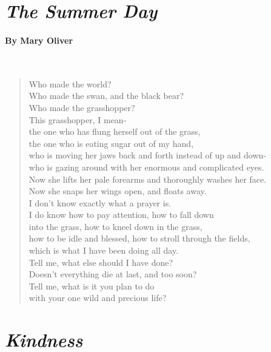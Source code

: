\newpage
{}
\section*{\emph{The Summer Day}}
\paragraph{By Mary Oliver}~
\begin{verse}
	Who made the world?\\
	Who made the swan, and the black bear?\\
	Who made the grasshopper?\\
	This grasshopper, I mean-\\
	the one who has flung herself out of the grass,\\
	the one who is eating sugar out of my hand,\\
	who is moving her jaws back and forth instead of up and down-\\
	who is gazing around with her enormous and complicated eyes.\\
	Now she lifts her pale forearms and thoroughly washes her face.\\
	Now she snaps her wings open, and floats away.\\
	I don't know exactly what a prayer is.\\
	I do know how to pay attention, how to fall down\\
	into the grass, how to kneel down in the grass,\\
	how to be idle and blessed, how to stroll through the fields,\\
	which is what I have been doing all day.\\
	Tell me, what else should I have done?\\
	Doesn't everything die at last, and too soon?\\
	Tell me, what is it you plan to do\\
	with your one wild and precious life?
\end{verse}

\newpage
\section*{\emph{Kindness}}
